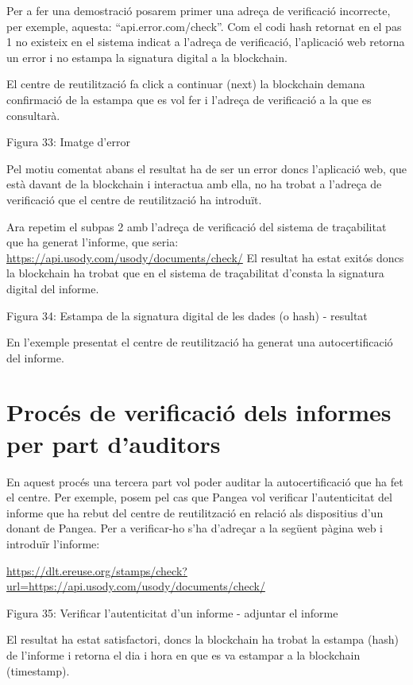 \documentclass[
]{book}
\begin{document}
Per a fer una demostració posarem primer una adreça de verificació incorrecte, per exemple, aquesta: ``api.error.com/check''. Com el codi hash retornat en el pas 1 no existeix en el sistema indicat a l'adreça de verificació, l'aplicació web retorna un error i no estampa la signatura digital a la blockchain.

El centre de reutilització fa click a continuar (next) la blockchain demana confirmació de la estampa que es vol fer i l'adreça de verificació a la que es consultarà.

Figura 33: Imatge d'error

Pel motiu comentat abans el resultat ha de ser un error doncs l'aplicació web, que està davant de la blockchain i interactua amb ella, no ha trobat a l'adreça de verificació que el centre de reutilització ha introduït.

Ara repetim el subpas 2 amb l'adreça de verificació del sistema de traçabilitat que ha generat l'informe, que seria: \url{https://api.usody.com/usody/documents/check/} El resultat ha estat exitós doncs la blockchain ha trobat que en el sistema de traçabilitat d'consta la signatura digital del informe.

Figura 34: Estampa de la signatura digital de les dades (o hash) - resultat

En l'exemple presentat el centre de reutilització ha generat una autocertificació del informe.

\hypertarget{procuxe9s-de-verificaciuxf3-dels-informes-per-part-dauditors}{%
\section{Procés de verificació dels informes per part d'auditors}\label{procuxe9s-de-verificaciuxf3-dels-informes-per-part-dauditors}}

En aquest procés una tercera part vol poder auditar la autocertificació que ha fet el centre. Per exemple, posem pel cas que Pangea vol verificar l'autenticitat del informe que ha rebut del centre de reutilització en relació als dispositius d'un donant de Pangea. Per a verificar-ho s'ha d'adreçar a la següent pàgina web i introduïr l'informe:

\url{https://dlt.ereuse.org/stamps/check?url=https://api.usody.com/usody/documents/check/}

Figura 35: Verificar l'autenticitat d'un informe - adjuntar el informe

El resultat ha estat satisfactori, doncs la blockchain ha trobat la estampa (hash) de l'informe i retorna el dia i hora en que es va estampar a la blockchain (timestamp).
\end{document}
